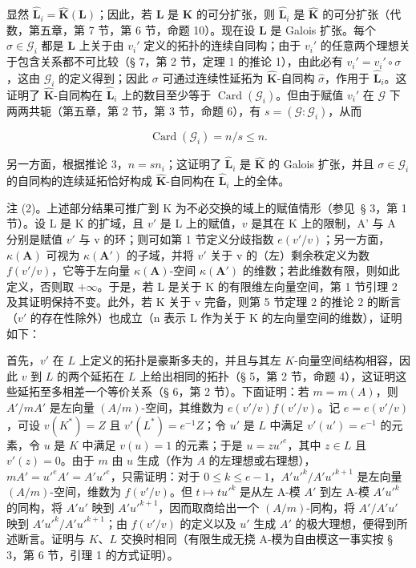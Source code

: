 显然 \(\hat{\mathbf{L}}_i = \hat{\mathbf{K}}(\mathbf{L})\)；因此，若 \(\mathbf{L}\) 是 \(\mathbf{K}\) 的可分扩张，则 \(\hat{\mathbf{L}}_i\) 是 \(\hat{\mathbf{K}}\) 的可分扩张（代数，第五章，第 7 节，第 6 节，命题 10）。现在设 \(\mathbf{L}\) 是 Galois 扩张。每个 \(\sigma \in \mathcal{G}_i\) 都是 \(\mathbf{L}\) 上关于由 \(v_i'\) 定义的拓扑的连续自同构；由于 \(v_i'\) 的任意两个理想关于包含关系都不可比较（§ 7，第 2 节，定理 1 的推论 1），由此必有 \(v_i' = v_i' \circ \sigma\)，这由 \(\mathcal{G}_i\) 的定义得到；因此 \(\sigma\) 可通过连续性延拓为 \(\hat{\mathbf{K}}\)-自同构 \(\hat{\sigma}\)，作用于 \(\hat{\mathbf{L}}_i\)。这证明了 \(\hat{\mathbf{K}}\)-自同构在 \(\hat{\mathbf{L}}_i\) 上的数目至少等于 \(\operatorname{Card}(\mathcal{G}_i)\)。但由于赋值 \(v_i'\) 在 \(\mathcal{G}\) 下两两共轭（第五章，第 2 节，第 3 节，命题 6），有 \(s = (\mathcal{G}: \mathcal{G}_i)\)，从而

\[
\operatorname{Card} \left(\mathcal {G} _ {i}\right) = n / s \leqslant n.
\]

另一方面，根据推论 3，\(n = sn_{i}\)；这证明了 \(\hat{\mathbf{L}}_{i}\) 是 \(\hat{\mathbf{K}}\) 的 Galois 扩张，并且 \(\sigma \in \mathcal{G}_{i}\) 的自同构的连续延拓恰好构成 \(\hat{\mathbf{K}}\)-自同构在 \(\hat{\mathbf{L}}_{i}\) 上的全体。

注 (2)。上述部分结果可推广到 K 为不必交换的域上的赋值情形（参见~§ 3，第 1 节）。设 L 是 K 的扩域，且 \(v'\) 是 L 上的赋值，\(v\) 是其在 K 上的限制，A' 与 A 分别是赋值 \(v'\) 与 v 的环；则可如第 1 节定义分歧指数 \(e(v'/v)\)；另一方面，\(\kappa(\mathbf{A})\) 可视为 \(\kappa(\mathbf{A}')\) 的子域，并将 \(v'\) 关于 v 的（左）剩余秩定义为数 \(f(v'/v)\)，它等于左向量 \(\kappa(\mathbf{A})\)-空间 \(\kappa(\mathbf{A}')\) 的维数；若此维数有限，则如此定义，否则取 \(+\infty\)。于是，若 L 是关于 K 的有限维左向量空间，第 1 节引理 2 及其证明保持不变。此外，若 K 关于 v 完备，则第 5 节定理 2 的推论 2 的断言（\(v'\) 的存在性除外）也成立（n 表示 L 作为关于 K 的左向量空间的维数），证明如下：

首先，\(v'\) 在 \(L\) 上定义的拓扑是豪斯多夫的，并且与其左 \(K\)-向量空间结构相容，因此 \(v\) 到 \(L\) 的两个延拓在 \(L\) 上给出相同的拓扑（§ 5，第 2 节，命题 4），这证明这些延拓至多相差一个等价关系（§ 6，第 2 节）。下面证明：若 \(m = m(A)\)，则 \(A'/mA'\) 是左向量 \((A/m)\)-空间，其维数为 \(e(v'/v)f(v'/v)\)。记 \(e = e(v'/v)\)，可设 \(v(K^*) = Z\) 且 \(v'(L^*) = e^{-1}Z\)；令 \(u'\) 是 \(L\) 中满足 \(v'(u') = e^{-1}\) 的元素，令 \(u\) 是 \(K\) 中满足 \(v(u) = 1\) 的元素；于是 \(u = zu'^e\)，其中 \(z \in L\) 且 \(v'(z) = 0\)。由于 \(m\) 由 \(u\) 生成（作为 \(A\) 的左理想或右理想），\(mA' = u'^eA' = A'u'^e\)，只需证明：对于 \(0 \leqslant k \leqslant e - 1\)，\(A'u'^k/A'u'^{k+1}\) 是左向量 \((A/m)\)-空间，维数为 \(f(v'/v)\)。但 \(t \mapsto tu'^k\) 是从左 A-模 \(A'\) 到左 A-模 \(A'u'^k\) 的同构，将 \(A'u'\) 映到 \(A'u'^{k+1}\)，因而取商给出一个 \((A/m)\)-同构，将 \(A'/A'u'\) 映到 \(A'u'^k/A'u'^{k+1}\)；由 \(f(v'/v)\) 的定义以及 \(u'\) 生成 \(A'\) 的极大理想，便得到所述断言。证明与 \(K\)、\(L\) 交换时相同（有限生成无挠 A-模为自由模这一事实按 § 3，第 6 节，引理 1 的方式证明）。

